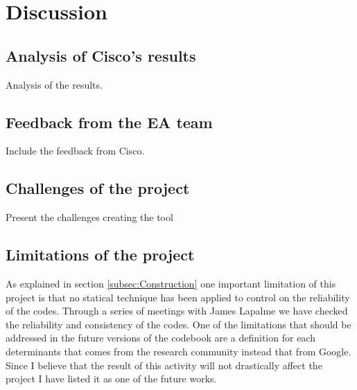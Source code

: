 
\chapter{Discussion} %

\label{Chapter7} %



\section{Analysis of Cisco's results}
Analysis of the results.

\section{Feedback from the EA team}
Include the feedback from Cisco.

\section{Challenges of the project}
Present the challenges creating the tool

\section{Limitations of the project}

As explained in section \ref{subsec:Construction} one important limitation of this project is that no statical technique has been applied to control on the reliability of the codes. Through a series of meetings with James Lapalme we have checked the reliability and consistency of the codes.
One of the limitations that should be addressed in the future versions of the codebook are a definition for each determinants that comes from the research community instead that from Google. Since I believe that the result of this activity will not drastically affect the project I have listed it as one of the future works.

